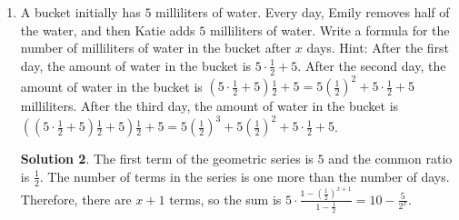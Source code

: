 \documentclass{article}
\theoremstyle{definition}
\newtheorem*{solution}{Solution}
\begin{document}
\begin{enumerate}
\begin{solution}
            $6Y + 45 = 12057$ for $Y$. Doing so, we get $6Y = 12012$ and $Y =
            2002$. If the movie came out in $2002$, then the seventh movie is
            expected to come out in $2002 + 3 \cdot 6 = 2002 + 18 = 2020$.
        \end{solution}
        \item A bucket initially has $5$ milliliters of water. Every day, Emily
        removes half of the water, and then Katie adds $5$ milliliters of water.
        Write a formula for the number of milliliters of water in the bucket
        after $x$ days. Hint: After the first day, the amount of water in the
        bucket is $5 \cdot \frac{1}{2} + 5$. After the second day, the amount of
        water in the bucket is $\left(5 \cdot \frac{1}{2} + 5\right)\frac{1}{2}
        + 5 = 5\left(\frac{1}{2}\right)^2 + 5 \cdot \frac{1}{2} + 5$
        milliliters. After the third day, the amount of water in the bucket is
        $\left(\left(5 \cdot \frac{1}{2} + 5\right)\frac{1}{2} +
        5\right)\frac{1}{2} + 5 = 5\left(\frac{1}{2}\right)^3 +
        5\left(\frac{1}{2}\right)^2 + 5 \cdot \frac{1}{2} + 5$.
        \begin{solution}
            The first term of the geometric series is $5$ and the common ratio
            is $\frac{1}{2}$. The number of terms in the series is one more than
            the number of days. Therefore, there are $x + 1$ terms, so the sum
            is $5 \cdot \frac{1 - \left(\frac{1}{2}\right)^{x + 1}}{1 -
            \frac{1}{2}} = 10 - \frac{5}{2^x}$.
        \end{solution}
    \end{enumerate}
\end{document}
